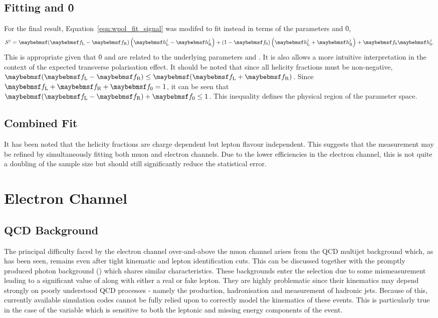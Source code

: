 \subsection{Fitting \fLmfR and \f0}
\label{sec:wpol_fit_fmfr}
For the final result, Equation~\ref{eqn:wpol_fit_signal} was modifed to fit
instead in terms of the parameters \fLmfR and \f0,
\begin{equation*}
S^j = \fLmfR \left (\hLj -\hRj\right) + \left(1-\f0\right)\left(\hLj +\hRj\right) +\f0\hZj.
\end{equation*}
This is appropriate given that \f0 and \fLmfR are related to the underlying
parameters \Azero and \Afour. It is also allows a more intuitive interpretation
in the context of the expected transverse polarisation effect. It should be
noted that since all helicity fractions must be non-negative,
$\fLmfR\leq\fLpfR$. Since $\fL +\fR + \f0 = 1$, it can be seen that $\fLmfR +
\f0 \leq 1$. This inequality defines the physical region of the parameter space.

\subsection{Combined Fit}
It has been noted that the helicity fractions are charge dependent but lepton
flavour independent. This suggests that the measurement may be refined by
simultaneously fitting both muon and electron channels. Due to the lower
efficiencies in the electron channel, this is not quite a doubling of the sample
size but should still significantly reduce the statistical error.

\section{Electron Channel}
\subsection{\ac{QCD} Background}
The principal difficulty faced by the electron channel over-and-above the muon
channel arises from the \ac{QCD} multijet background which, as has been seen,
remains even after tight kinematic and lepton identification cuts. This can be
discussed together with the promptly produced photon background (\gammajets)
which shares similar characteristics. These backgrounds enter the selection due
to some mismeasurement leading to a significant value of \PtW along with either
a real or fake lepton. They are highly problematic since their kinematics may
depend strongly on poorly understood \ac{QCD} processes - namely the production,
hadronisation and measurement of hadronic jets. Because of this, currently
available simulation codes cannot be fully relied upon to correctly model the
kinematics of these events. This is particularly true in the case of the \LP
variable which is sensitive to both the leptonic and missing energy components
of the event.


